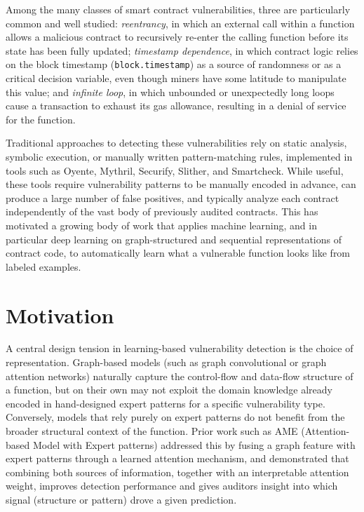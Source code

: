 \documentclass[12pt, a4paper, openright, twoside]{report}
\begin{document}
Among the many classes of smart contract vulnerabilities, three are particularly common and well studied: \textit{reentrancy}, in which an external call within a function allows a malicious contract to recursively re-enter the calling function before its state has been fully updated; \textit{timestamp dependence}, in which contract logic relies on the block timestamp (\texttt{block.timestamp}) as a source of randomness or as a critical decision variable, even though miners have some latitude to manipulate this value; and \textit{infinite loop}, in which unbounded or unexpectedly long loops cause a transaction to exhaust its gas allowance, resulting in a denial of service for the function.

Traditional approaches to detecting these vulnerabilities rely on static analysis, symbolic execution, or manually written pattern-matching rules, implemented in tools such as Oyente, Mythril, Securify, Slither, and Smartcheck. While useful, these tools require vulnerability patterns to be manually encoded in advance, can produce a large number of false positives, and typically analyze each contract independently of the vast body of previously audited contracts. This has motivated a growing body of work that applies machine learning, and in particular deep learning on graph-structured and sequential representations of contract code, to automatically learn what a vulnerable function looks like from labeled examples.

\section{Motivation}

A central design tension in learning-based vulnerability detection is the choice of representation. Graph-based models (such as graph convolutional or graph attention networks) naturally capture the control-flow and data-flow structure of a function, but on their own may not exploit the domain knowledge already encoded in hand-designed expert patterns for a specific vulnerability type. Conversely, models that rely purely on expert patterns do not benefit from the broader structural context of the function. Prior work such as AME (Attention-based Model with Expert patterns) addressed this by fusing a graph feature with expert patterns through a learned attention mechanism, and demonstrated that combining both sources of information, together with an interpretable attention weight, improves detection performance and gives auditors insight into which signal (structure or pattern) drove a given prediction.
\end{document}
